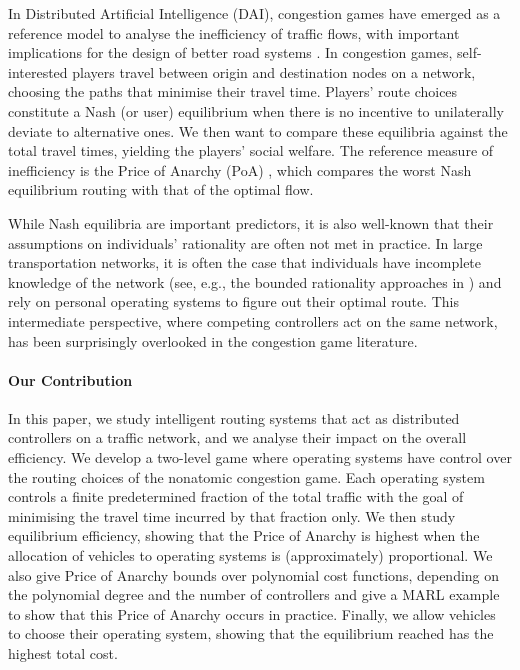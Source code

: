 \documentclass{article}
\begin{document}
  In Distributed Artificial Intelligence (DAI), congestion games \cite{Rosenthal} have emerged as a reference model to analyse the inefficiency of traffic flows, with important implications for the design of better road systems \cite{Wu2019}. In congestion games, self-interested players travel between origin and destination nodes on a network, choosing the paths that minimise their travel time. Players' route choices constitute a Nash (or user) equilibrium when there is no incentive to unilaterally deviate to alternative ones. We then want to compare these equilibria against the total travel times, yielding the players' social welfare. The reference measure of inefficiency is the Price of Anarchy (PoA) \cite{Koutsoupias2009}, which compares the worst Nash equilibrium routing with that of the optimal flow. 

  While Nash equilibria are important predictors, it is also well-known that their assumptions on individuals' rationality are often not met in practice. In large transportation networks, it is often the case that individuals have incomplete knowledge of the network (see, e.g., the bounded rationality approaches in \cite{Acemoglu,Meir2018}) and rely on personal operating systems to figure out their optimal route. This intermediate perspective, where competing controllers act on the same network, has been surprisingly overlooked in the congestion game literature.

\paragraph{Our Contribution}
  In this paper, we study intelligent routing systems that act as distributed controllers on a traffic network, and we analyse their impact on the overall efficiency. 
   We develop a two-level game where operating systems have control over the routing choices of the nonatomic congestion game. Each operating system controls a finite predetermined fraction of the total traffic with the goal of minimising the travel time incurred by that fraction only. 
  We then study equilibrium efficiency, showing that the Price of Anarchy is highest when the allocation of vehicles to operating systems is (approximately) proportional. We also give Price of Anarchy bounds over polynomial cost functions, depending on the polynomial degree and the number of controllers and give a MARL example to show that this Price of Anarchy occurs in practice. Finally, we allow vehicles to choose their operating system, showing that the equilibrium reached has the highest total cost.
\end{document}
